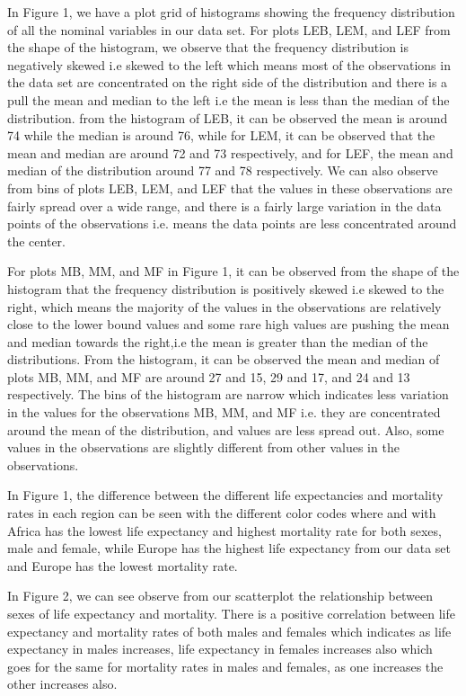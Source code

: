 \documentclass[12 pt]{scrartcl}
\begin{document}
In Figure 1, we have a plot grid of histograms showing the frequency distribution of all the nominal variables in our data set. For plots LEB, LEM, and LEF from the shape of the histogram, we observe that the frequency distribution is negatively skewed i.e skewed to the left which means most of the observations in the data set are concentrated on the right side of the distribution and there is a pull the mean and median to the left i.e the mean is less than the median of the distribution. from the histogram of LEB, it can be observed the mean is around 74 while the median is around 76, while for LEM, it can be observed that the mean and median are around 72 and 73 respectively, and for LEF, the mean and median of the distribution around 77 and 78 respectively. We can also observe from bins of plots LEB, LEM, and LEF that the values in these observations are fairly spread over a wide range, and there is a fairly large variation in the data points of the observations i.e. means the data points are less concentrated around the center.

For plots MB, MM, and MF in Figure 1, it can be observed from the shape of the histogram that the frequency distribution is positively skewed i.e skewed to the right, which means the majority of the values in the observations are relatively close to the lower bound values and some rare high values are pushing the mean and median towards the right,i.e the mean is greater than the median of the distributions. From the histogram, it can be observed the mean and median of plots MB, MM, and MF are around 27 and 15, 29 and 17, and 24 and 13 respectively. The bins of the histogram are narrow which indicates less variation in the values for the observations MB, MM, and MF i.e. they are concentrated around the mean of the distribution, and values are less spread out. Also, some values in the observations are slightly different from other values in the observations.

In Figure 1, the difference between the different life expectancies and mortality rates in each region can be seen with the different color codes where and with Africa has the lowest life expectancy and highest mortality rate for both sexes, male and female, while Europe has the highest life expectancy from our data set and Europe has the lowest mortality rate.

In Figure 2, we can see observe from our scatterplot the relationship between sexes of life expectancy and mortality. There is a positive correlation between life expectancy and mortality rates of both males and females which indicates as life expectancy in males increases, life expectancy in females increases also which goes for the same for mortality rates in males and females, as one increases the other increases also.
\end{document}
